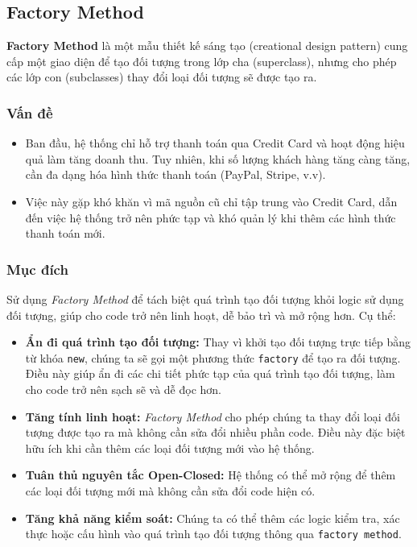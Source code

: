\subsection{Factory Method}
\begin{flushleft}
    \textbf{Factory Method} là một mẫu thiết kế sáng tạo (creational design pattern) cung cấp một giao diện để tạo đối tượng trong lớp cha (superclass), nhưng cho phép các lớp con (subclasses) thay đổi loại đối tượng sẽ được tạo ra.
\end{flushleft}

\subsubsection{Vấn đề}
\begin{flushleft}
    \begin{itemize}
        \item Ban đầu, hệ thống chỉ hỗ trợ thanh toán qua Credit Card và hoạt động hiệu quả làm tăng doanh thu. Tuy nhiên, khi số lượng khách hàng tăng càng tăng, cần đa dạng hóa hình thức thanh toán (PayPal, Stripe, v.v).

        \item Việc này gặp khó khăn vì mã nguồn cũ chỉ tập trung vào Credit Card, dẫn đến việc hệ thống trở nên phức tạp và khó quản lý khi thêm các hình thức thanh toán mới.
    \end{itemize}
\end{flushleft}

\subsubsection{Mục đích}
\begin{flushleft}
    Sử dụng \textit{Factory Method} để tách biệt quá trình tạo đối tượng khỏi logic sử dụng đối tượng, giúp cho code trở nên linh hoạt, dễ bảo trì và mở rộng hơn. Cụ thể:
    \begin{itemize}
        \item \textbf{Ẩn đi quá trình tạo đối tượng:} Thay vì khởi tạo đối tượng trực tiếp bằng từ khóa \verb|new|, chúng ta sẽ gọi một phương thức \verb|factory| để tạo ra đối tượng. Điều này giúp ẩn đi các chi tiết phức tạp của quá trình tạo đối tượng, làm cho code trở nên sạch sẽ và dễ đọc hơn.
        \item \textbf{Tăng tính linh hoạt:} \textit{Factory Method} cho phép chúng ta thay đổi loại đối tượng được tạo ra mà không cần sửa đổi nhiều phần code. Điều này đặc biệt hữu ích khi cần thêm các loại đối tượng mới vào hệ thống.
        \item \textbf{Tuân thủ nguyên tắc Open-Closed:} Hệ thống có thể mở rộng để thêm các loại đối tượng mới mà không cần sửa đổi code hiện có.
        \item \textbf{Tăng khả năng kiểm soát:} Chúng ta có thể thêm các logic kiểm tra, xác thực hoặc cấu hình vào quá trình tạo đối tượng thông qua \verb|factory method|.
    \end{itemize}
\end{flushleft}

